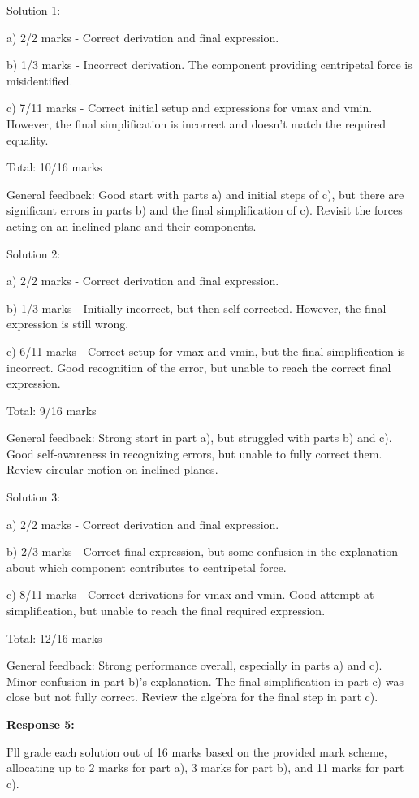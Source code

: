 \documentclass[a4paper,11pt]{article}
\begin{document}
Solution 1:

a) 2/2 marks - Correct derivation and final expression.

b) 1/3 marks - Incorrect derivation. The component providing centripetal force is misidentified.

c) 7/11 marks - Correct initial setup and expressions for vmax and vmin. However, the final simplification is incorrect and doesn't match the required equality.

Total: 10/16 marks

General feedback: Good start with parts a) and initial steps of c), but there are significant errors in parts b) and the final simplification of c). Revisit the forces acting on an inclined plane and their components.

Solution 2:

a) 2/2 marks - Correct derivation and final expression.

b) 1/3 marks - Initially incorrect, but then self-corrected. However, the final expression is still wrong.

c) 6/11 marks - Correct setup for vmax and vmin, but the final simplification is incorrect. Good recognition of the error, but unable to reach the correct final expression.

Total: 9/16 marks

General feedback: Strong start in part a), but struggled with parts b) and c). Good self-awareness in recognizing errors, but unable to fully correct them. Review circular motion on inclined planes.

Solution 3:

a) 2/2 marks - Correct derivation and final expression.

b) 2/3 marks - Correct final expression, but some confusion in the explanation about which component contributes to centripetal force.

c) 8/11 marks - Correct derivations for vmax and vmin. Good attempt at simplification, but unable to reach the final required expression.

Total: 12/16 marks

General feedback: Strong performance overall, especially in parts a) and c). Minor confusion in part b)'s explanation. The final simplification in part c) was close but not fully correct. Review the algebra for the final step in part c).

\bigskip
\textbf{Response 5:}

I'll grade each solution out of 16 marks based on the provided mark scheme, allocating up to 2 marks for part a), 3 marks for part b), and 11 marks for part c).
\end{document}
